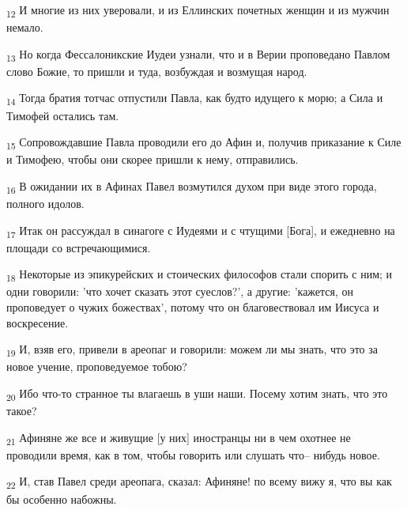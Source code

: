 \begin{tcolorbox}
\textsubscript{12} И многие из них уверовали, и из Еллинских почетных женщин и из мужчин немало.
\end{tcolorbox}
\begin{tcolorbox}
\textsubscript{13} Но когда Фессалоникские Иудеи узнали, что и в Верии проповедано Павлом слово Божие, то пришли и туда, возбуждая и возмущая народ.
\end{tcolorbox}
\begin{tcolorbox}
\textsubscript{14} Тогда братия тотчас отпустили Павла, как будто идущего к морю; а Сила и Тимофей остались там.
\end{tcolorbox}
\begin{tcolorbox}
\textsubscript{15} Сопровождавшие Павла проводили его до Афин и, получив приказание к Силе и Тимофею, чтобы они скорее пришли к нему, отправились.
\end{tcolorbox}
\begin{tcolorbox}
\textsubscript{16} В ожидании их в Афинах Павел возмутился духом при виде этого города, полного идолов.
\end{tcolorbox}
\begin{tcolorbox}
\textsubscript{17} Итак он рассуждал в синагоге с Иудеями и с чтущими [Бога], и ежедневно на площади со встречающимися.
\end{tcolorbox}
\begin{tcolorbox}
\textsubscript{18} Некоторые из эпикурейских и стоических философов стали спорить с ним; и одни говорили: 'что хочет сказать этот суеслов?', а другие: 'кажется, он проповедует о чужих божествах', потому что он благовествовал им Иисуса и воскресение.
\end{tcolorbox}
\begin{tcolorbox}
\textsubscript{19} И, взяв его, привели в ареопаг и говорили: можем ли мы знать, что это за новое учение, проповедуемое тобою?
\end{tcolorbox}
\begin{tcolorbox}
\textsubscript{20} Ибо что-то странное ты влагаешь в уши наши. Посему хотим знать, что это такое?
\end{tcolorbox}
\begin{tcolorbox}
\textsubscript{21} Афиняне же все и живущие [у них] иностранцы ни в чем охотнее не проводили время, как в том, чтобы говорить или слушать что-- нибудь новое.
\end{tcolorbox}
\begin{tcolorbox}
\textsubscript{22} И, став Павел среди ареопага, сказал: Афиняне! по всему вижу я, что вы как бы особенно набожны.
\end{tcolorbox}
